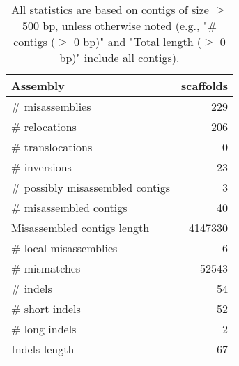 \documentclass[12pt,a4paper]{article}
\begin{document}
\begin{table}[ht]
\begin{center}
\caption{All statistics are based on contigs of size $\geq$ 500 bp, unless otherwise noted (e.g., "\# contigs ($\geq$ 0 bp)" and "Total length ($\geq$ 0 bp)" include all contigs).}
\begin{tabular}{|l*{1}{|r}|}
\hline
Assembly & scaffolds \\ \hline
\# misassemblies & 229 \\ \hline
\hspace{5mm}\# relocations & 206 \\ \hline
\hspace{5mm}\# translocations & 0 \\ \hline
\hspace{5mm}\# inversions & 23 \\ \hline
\# possibly misassembled contigs & 3 \\ \hline
\# misassembled contigs & 40 \\ \hline
Misassembled contigs length & 4147330 \\ \hline
\# local misassemblies & 6 \\ \hline
\# mismatches & 52543 \\ \hline
\# indels & 54 \\ \hline
\hspace{5mm}\# short indels & 52 \\ \hline
\hspace{5mm}\# long indels & 2 \\ \hline
Indels length & 67 \\ \hline
\end{tabular}
\end{center}
\end{table}
\end{document}
